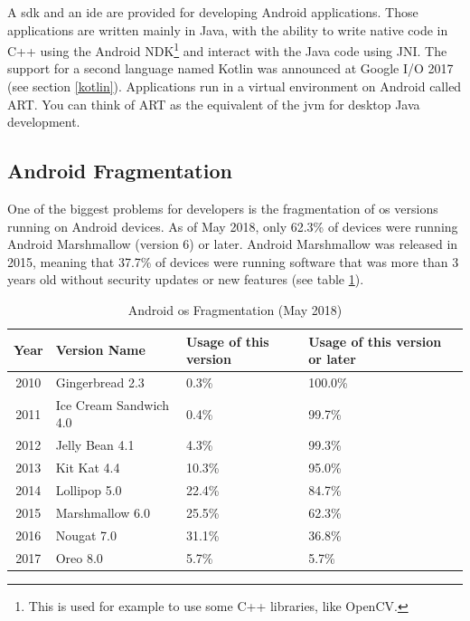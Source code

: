 \documentclass[twoside, openright,11pt,a4paper]{book}
\begin{document}
A \gls{sdk} and an \gls{ide} are provided for developing Android applications. Those applications are written mainly in Java, with the ability to write native code in C++ using the Android NDK\footnote{This is used for example to use some C++ libraries, like OpenCV.} and interact with the Java code using JNI. The support for a second language named Kotlin was announced at Google I/O 2017 (see section \ref{kotlin}). Applications run in a virtual environment on Android called ART. You can think of ART as the equivalent of the \gls{jvm} for desktop Java development.
\subsection{Android Fragmentation}
One of the biggest problems for developers is the fragmentation of \gls{os} versions running on Android devices. As of May 2018, only 62.3\% of devices were running Android Marshmallow (version 6) or later. Android Marshmallow was released in 2015, meaning that 37.7\% of devices were running software that was more than 3 years old without security updates or new features (see table \ref{android_os_table}).

\begin{table}[H]
\centering
\bgroup
\def\arraystretch{1.5}%
\begin{tabularx}{\textwidth}{|c|l|X|X|}
\hline
  \textbf{Year} & \textbf{Version Name} & \textbf{Usage of this version} & \textbf{Usage of this version or later}\\
  \hline
2010 & Gingerbread 2.3 & 0.3\% & 100.0\% \\
\hline
2011 & Ice Cream Sandwich 4.0 & 0.4\% & 99.7\% \\
\hline
2012 & Jelly Bean 4.1 & 4.3\% & 99.3\% \\
\hline
2013 & Kit Kat 4.4 & 10.3\% & 95.0\% \\
\hline
2014 & Lollipop 5.0 & 22.4\% & 84.7\% \\
\hline
2015 & Marshmallow 6.0 & 25.5\% & 62.3\% \\
\hline
2016 & Nougat 7.0 & 31.1\% & 36.8\% \\
\hline
2017 & Oreo 8.0 & 5.7\% & 5.7\% \\
\hline
\end{tabularx}
\egroup
\caption[Android OS Fragmentation]{Android \gls{os} Fragmentation (May 2018)\cite{android:dev:osfragmentation}}
\label{android_os_table}
\end{table}
\end{document}
